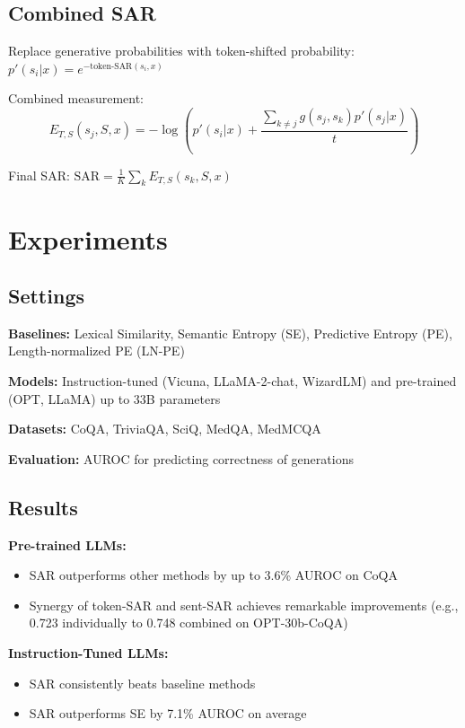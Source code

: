 \subsection{Combined SAR}
Replace generative probabilities with token-shifted probability:
$p'(s_i|x) = e^{-\text{token-SAR}(s_i, x)}$

Combined measurement:
\begin{equation}
E_{T,S}(s_j, S, x) = -\log(p'(s_i|x) + \frac{\sum_{k \neq j}{g(s_j, s_k)p'(s_j|x)}}{t})
\end{equation}

Final SAR: $\text{SAR} = \frac{1}{K}\sum_k E_{T,S}(s_k, S, x)$

\section{Experiments}

\subsection{Settings}
\textbf{Baselines:} Lexical Similarity, Semantic Entropy (SE), Predictive Entropy (PE), Length-normalized PE (LN-PE)

\textbf{Models:} Instruction-tuned (Vicuna, LLaMA-2-chat, WizardLM) and pre-trained (OPT, LLaMA) up to 33B parameters

\textbf{Datasets:} CoQA, TriviaQA, SciQ, MedQA, MedMCQA

\textbf{Evaluation:} AUROC for predicting correctness of generations

\subsection{Results}

\textbf{Pre-trained LLMs:}
\begin{itemize}
\item SAR outperforms other methods by up to 3.6\% AUROC on CoQA
\item Synergy of token-SAR and sent-SAR achieves remarkable improvements (e.g., 0.723 individually to 0.748 combined on OPT-30b-CoQA)
\end{itemize}

\textbf{Instruction-Tuned LLMs:}
\begin{itemize}
\item SAR consistently beats baseline methods
\item SAR outperforms SE by 7.1\% AUROC on average
\end{itemize}

